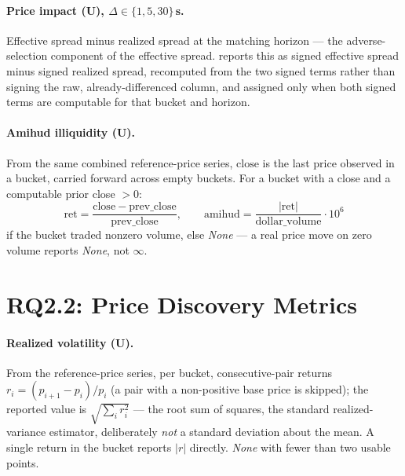 \paragraph{Price impact (U), $\Delta \in \{1,5,30\}$\,s.} Effective
spread minus realized spread at the matching horizon --- the
adverse-selection component of the effective spread. 
reports this as signed effective spread minus signed realized spread,
recomputed from the two signed terms rather than signing the raw,
already-differenced column, and assigned only when both signed terms are
computable for that bucket and horizon.

\paragraph{Amihud illiquidity (U).} From the same combined reference-price
series, $\mathrm{close}$ is the last price observed in a bucket, carried
forward across empty buckets. For a bucket with a close and a computable
prior close $>0$:
\begin{equation}
  \mathrm{ret} = \frac{\mathrm{close}-\mathrm{prev\_close}}{\mathrm{prev\_close}},
  \qquad
  \mathrm{amihud} = \frac{|\mathrm{ret}|}{\mathrm{dollar\_volume}} \cdot 10^{6}
\end{equation}
if the bucket traded nonzero volume, else \emph{None} --- a real price
move on zero volume reports \emph{None}, not $\infty$.

\section{RQ2.2: Price Discovery Metrics}
\label{sec:formularq22}

\paragraph{Realized volatility (U).} From the reference-price series,
per bucket, consecutive-pair returns $r_i = (p_{i+1}-p_i)/p_i$
(a pair with a non-positive base price is skipped); the reported value
is $\sqrt{\sum_i r_i^2}$ --- the root sum of squares, the standard
realized-variance estimator, deliberately \emph{not} a standard
deviation about the mean. A single return in the bucket reports
$|r|$ directly. \emph{None} with fewer than two usable points.

